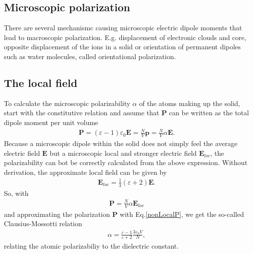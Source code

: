 \subsection{Microscopic polarization}
There are several mechanismc causing microscopic electric dipole moments that lead to macroscopic 
polarization. E.g. displacement of electronic clouds and core, opposite displacement of the ions 
in a solid or
orientation of permanent dipoles such as water molecules, called orientational polarization.

\subsection{The local field}
To calculate the microscopic polarizability $\alpha$ of the atoms making up the solid, start with
the constitutive relation and assume that $\boldsymbol P$ can be written as the total dipole moment 
per unit volume
\begin{align}
   \boldsymbol P = (\varepsilon - 1 ) \varepsilon_0 \boldsymbol E = \frac{N}{V} \boldsymbol p = \frac{N}{V}\alpha \boldsymbol E.
   \label{nonLocalP}
\end{align}
Because a microscopic dipole within the solid does not simply feel the average electric field 
$\boldsymbol E$ but a microscopic local and stronger electric field $\boldsymbol E_{loc}$, the polarizability
can bot be correctly calculated from the above expression.
Without derivation, the approximate local field can be given by
\begin{align}
   \boldsymbol E_{loc} = \frac{1}{3}(\varepsilon + 2) \boldsymbol E.
\end{align}
So, with
\begin{align}
   \boldsymbol P = \frac{N}{V}\alpha \boldsymbol E_{loc}
\end{align}
and approximating the polarization $\boldsymbol P$ with Eq.\eqref{nonLocalP}, 
we get the so-called Clausius-Mossotti relation
\begin{align}
   \alpha = \frac{\varepsilon - 1}{\varepsilon + 2} \frac{3 \varepsilon_0 V}{N},
\end{align}
relating the atomic polarizabiliy to the dielectric constant.

